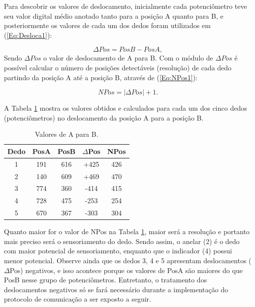 \documentclass[
	12pt,				%
	openright,			%
	oneside,			%
	a4paper,			%
	english,			%
	brazil				%
	]{abntex2}
\begin{document}
		Para descobrir os valores de deslocamento, inicialmente cada potenciômetro teve seu valor digital médio anotado tanto para a posição A quanto para B, e posteriormente os valores de cada um dos dedos foram utilizados em (\ref{Eq:Desloca1}):

	\begin{equation}
			\Delta Pos 	= Pos B 	- 	Pos A ,
		\label{Eq:Desloca1}
	\end{equation}
Sendo $\Delta Pos$ o valor de deslocamento de A para B. Com o módulo de $\Delta Pos$ é possível calcular o número de posições detectáveis (resolução) de cada dedo partindo da posição A até a posição B, através de (\ref{Eq:NPos1}):

	\begin{equation}
			NPos = |\Delta Pos| + 1.
		\label{Eq:NPos1}
	\end{equation}

		A Tabela \ref{Tab:deltapos} mostra os valores obtidos e calculados para cada um dos cinco dedos (potenciômetros) no deslocamento da posição A para a posição B.


	\begin{table}[H]
  	\centering
		\caption{Valores de A para B.}
    \begin{tabular}{c|cccc}
      \midrule
			Dedo	& PosA	& PosB	& $\Delta$Pos	& NPos	\\
      \midrule
			1 		& 191 	& 616 	& 		+425 		&	426		\\
			2 		& 140 	& 609 	& 		+469 		&	470		\\
			3 		& 774 	& 360 	& 		-414 		&	415		\\
			4 		& 728 	& 475 	& 		-253 		&	254		\\
			5 		& 670 	& 367 	& 		-303 		&	304		\\      
      \midrule
    \end{tabular}
    \label{Tab:deltapos}
	\end{table}
		
		Quanto maior for o valor de NPos na Tabela \ref{Tab:deltapos}, maior será a resolução e portanto mais preciso será o sensoriamento do dedo. Sendo assim, o anelar (2) é o dedo com maior potencial de sensoriamento, enquanto que o indicador (4) possui menor potencial. Observe ainda que os dedos 3, 4 e 5 apresentam deslocamentos ($\Delta$Pos) negativos, e isso acontece porque os valores de PosA são maiores do que PosB nesse grupo de potenciômetros. Entretanto, o tratamento dos deslocamentos negativos só se fará necessário durante a implementação do protocolo de comunicação a ser exposto a seguir.
\end{document}
